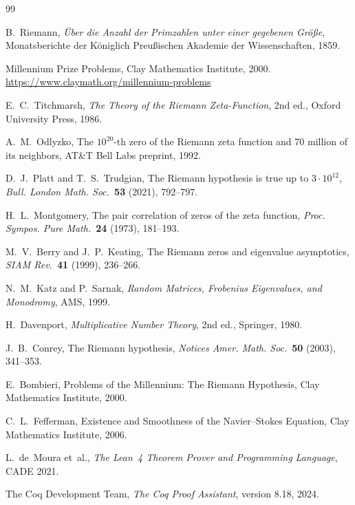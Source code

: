 \documentclass[12pt]{article}
\theoremstyle{plain}
\theoremstyle{definition}
\begin{document}

\begin{thebibliography}{99}

B.~Riemann,
\emph{{\"U}ber die Anzahl der Primzahlen unter einer gegebenen Gr{\"o}{\ss}e},
Monatsberichte der K{\"o}niglich Preu{\ss}ischen Akademie der Wissenschaften,
1859.

Millennium Prize Problems,
Clay Mathematics Institute, 2000.
\url{https://www.claymath.org/millennium-problems}

E.~C.~Titchmarsh,
\emph{The Theory of the Riemann Zeta-Function}, 2nd ed.,
Oxford University Press, 1986.

A.~M.~Odlyzko,
The $10^{20}$-th zero of the Riemann zeta function and 70 million of its
neighbors,
AT\&T Bell Labs preprint, 1992.

D.~J.~Platt and T.~S.~Trudgian,
The Riemann hypothesis is true up to $3\cdot10^{12}$,
\emph{Bull. London Math. Soc.}\ \textbf{53} (2021), 792--797.

H.~L.~Montgomery,
The pair correlation of zeros of the zeta function,
\emph{Proc. Sympos. Pure Math.}\ \textbf{24} (1973), 181--193.

M.~V.~Berry and J.~P.~Keating,
The Riemann zeros and eigenvalue asymptotics,
\emph{SIAM Rev.}\ \textbf{41} (1999), 236--266.

N.~M.~Katz and P.~Sarnak,
\emph{Random Matrices, Frobenius Eigenvalues, and Monodromy},
AMS, 1999.

H.~Davenport,
\emph{Multiplicative Number Theory}, 2nd ed.,
Springer, 1980.

J.~B.~Conrey,
The Riemann hypothesis,
\emph{Notices Amer. Math. Soc.}\ \textbf{50} (2003), 341--353.

E.~Bombieri,
Problems of the Millennium: The Riemann Hypothesis,
Clay Mathematics Institute, 2000.

C.~L.~Fefferman,
Existence and Smoothness of the Navier--Stokes Equation,
Clay Mathematics Institute, 2006.

L.~de~Moura et~al.,
\emph{The Lean~4 Theorem Prover and Programming Language},
CADE 2021.

The Coq Development Team,
\emph{The Coq Proof Assistant}, version 8.18, 2024.


\end{thebibliography}
\end{document}
